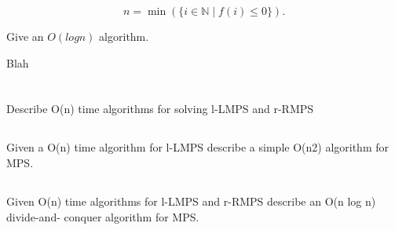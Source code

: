 \documentclass{amsart}
\theoremstyle{definition}
\theoremstyle{remark}
\numberwithin{equation}{section}
\newcommand{\NN}{\mathbb N}
\begin{document}
$$ n = \min (\{i \in \NN \mid f(i) \leq 0 \}).$$ 

Give an $O(log n)$ algorithm.

\alg
Blah

\section{}

\subsection{} Describe O(n) time algorithms for solving l-LMPS and r-RMPS

\subsection{} Given a O(n) time algorithm for l-LMPS describe a simple O(n2) algorithm for MPS.

\subsection{} Given O(n) time algorithms for l-LMPS and r-RMPS describe an O(n log n) divide-and- conquer algorithm for MPS.
\end{document}
